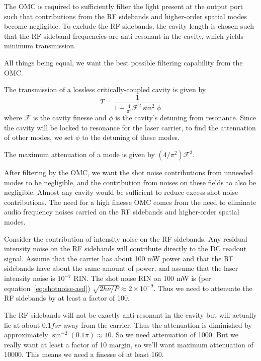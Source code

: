 
The OMC is required to sufficiently filter the light present at the
output port such that contributions from the RF sidebands and higher-order
spatial modes become negligible. To exclude the RF sidebands, the
cavity length is chosen such that the RF sideband frequencies are
anti-resonant in the cavity, which yields minimum transmission.


All things being equal, we want the best possible filtering capability
from the OMC.  

The transmission of a lossless critically-coupled cavity is given by
\begin{equation}
T = \frac{1}{1 + \frac{4}{\pi^2}\mathcal{F}^2\sin^2\phi}
\end{equation}
where $\mathcal{F}$ is the cavity finesse and $\phi$ is the cavity's
detuning from resonance.  Since the cavity will be locked to resonance
for the laser carrier, to find the attenuation of other modes, we set
$\phi$ to the detuning of these modes.

The maximum attenuation of a mode is given by $(4/\pi^2)\mathcal{F^2}$.

After filtering by the OMC, we want the shot noise contributions from
unneeded modes to be negligible, and the contribution from noises on
these fields to also be negligible.  Almost any cavity would be
sufficient to reduce excess shot noise contributions.  The need for a
high finesse OMC comes from the need to eliminate audio frequency
noises carried on the RF sidebands and higher-order spatial modes.

Consider the contribution of intensity noise on the RF sidebands.  Any
residual intensity noise on the RF sidebands will contribute directly
to the DC readout signal.  Assume that the carrier has about 100 mW
power and that the RF sidebands have about the same amount of power,
and assume that the laser intensity noise is $10^{-7}$ RIN.  The shot
noise RIN on 100 mW is (per equation~\ref{eq:shotnoise-asd})
$\sqrt{2h\nu/P} \approx 2\times10^{-9}$.  Thus we need to attenuate
the RF sidebands by at least a factor of 100.

The RF sidebands will not be exactly anti-resonant in the cavity but
will actually lie at about $0.1 fsr$ away from the carrier.  Thus the
attenuation is diminished by approximately $\sin^{-2} (0.1 \pi)
\approx 10$.  So we need attenuation of 1000.  But we really want at
least a factor of 10 margin, so we'll want maximum attenuation of
10000. This means we need a finesse of at least 160.



